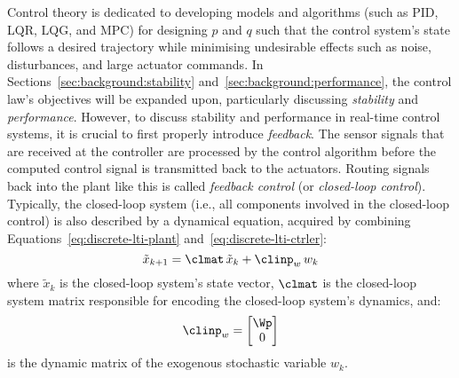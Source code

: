 Control theory is dedicated to developing models and algorithms (such as PID, LQR, LQG, and MPC) for designing $p$ and $q$ such that the control system's state follows a desired trajectory while minimising undesirable effects such as noise, disturbances, and large actuator commands.
In Sections~\ref{sec:background:stability} and~\ref{sec:background:performance}, the control law's objectives will be expanded upon, particularly discussing \emph{stability}  and \emph{performance}.
However, to discuss stability and performance in real-time control systems, it is crucial to first properly introduce \emph{feedback}.
The sensor signals that are received at the controller are processed by the control algorithm before the computed control signal is transmitted back to the actuators.
Routing signals back into the plant like this is called \emph{feedback control} (or \emph{closed-loop control}).
Typically, the closed-loop system (i.e., all components involved in the closed-loop control) is also described by a dynamical equation, acquired by combining Equations~\eqref{eq:discrete-lti-plant} and~\eqref{eq:discrete-lti-ctrler}:
%
\begin{equation}%
    \label{eq:clsys}%
    \tilde{x}_{k+1} = \clmat\, \tilde{x}_k + \clinp_w\, w_k
\end{equation}
%
where $\tilde{x}_k$ is the closed-loop system's state vector, $\clmat$ is the closed-loop system matrix responsible for encoding the closed-loop system's dynamics, and:
%
\begin{equation*}%
    \clinp_w = \begin{bmatrix}
        \Wp \\
        0
    \end{bmatrix}
\end{equation*}
%
is the dynamic matrix of the exogenous stochastic variable $w_k$.

